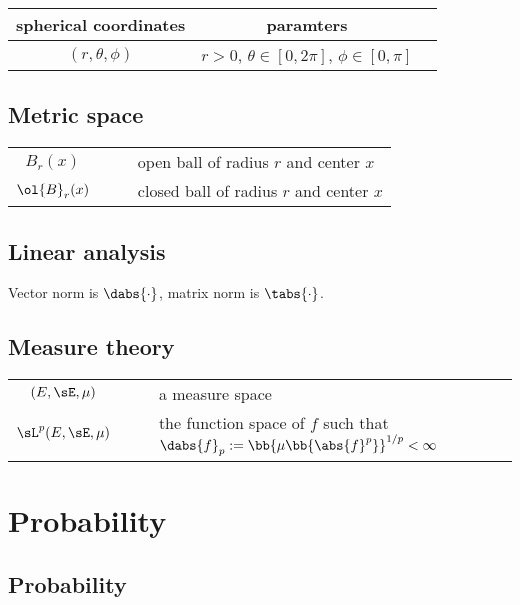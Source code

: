 \begin{center}
\begin{longtable}{ccl}
\hline
spherical coordinates & paramters \\
\hline
$(r,\theta,\phi)$ & $r>0$, $\theta\in [0,2\pi]$, $\phi\in [0,\pi]$ \\
\hline
\end{longtable}
\end{center}

\subsection{Metric space}

\begin{center}
\begin{longtable}{ccl}
\hline
$B_r(x)$ & $\quad$ & open ball of radius $r$ and center $x$ \\
$\ol{B}_r(x)$ & $\quad$ & closed ball of radius $r$ and center $x$ \\
\hline
\end{longtable}
\end{center}


\subsection{Linear analysis}

Vector norm is $\dabs{\cdot}$, matrix norm is $\tabs{\cdot}$.

\subsection{Measure theory}

\begin{center}
\begin{longtable}{ccl}
\hline
$(E,\sE,\mu)$ & $\quad$ & a measure space\\
$\sL^p(E,\sE,\mu)$ & & the function space of $f$ such that $\dabs{f}_p := \bb{\mu\bb{\abs{f}^p}}^{1/p} < \infty$\\
\hline
\end{longtable}
\end{center}

\section{Probability}

\subsection{Probability}

